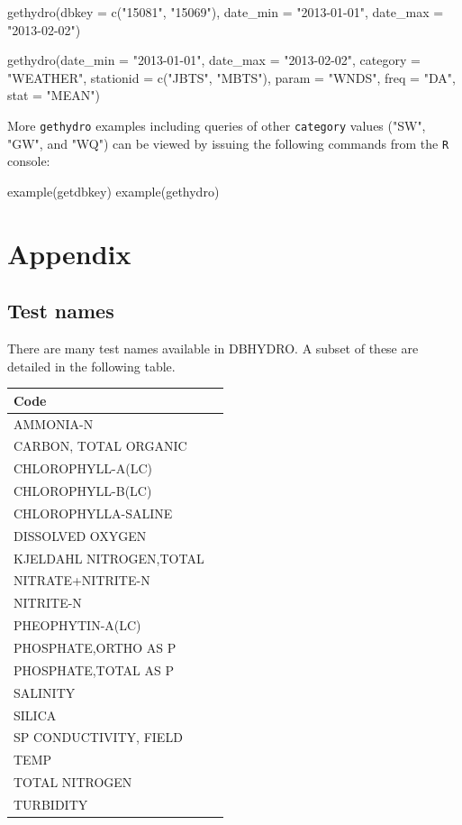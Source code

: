 \documentclass[12pt,notitlepage]{article}
\begin{document}
\begin{Schunk}
\begin{Sinput}
 gethydro(dbkey = c("15081", "15069"), date_min = "2013-01-01",
          date_max = "2013-02-02")
\end{Sinput}
\end{Schunk}

\begin{Schunk}
\begin{Sinput}
 gethydro(date_min = "2013-01-01", date_max = "2013-02-02",
          category = "WEATHER", stationid = c("JBTS", "MBTS"),
          param = "WNDS", freq = "DA", stat = "MEAN")
\end{Sinput}
\end{Schunk}

\noindent More \texttt{gethydro} examples including queries of other \texttt{category} values ("SW", "GW", and "WQ") can be viewed by issuing the following commands from the \texttt{R} console:

\begin{Schunk}
\begin{Sinput}
 example(getdbkey)
 example(gethydro)
\end{Sinput}
\end{Schunk}

\newpage

\section{\label{sec:appendix}Appendix}
\subsection{Test names}
There are many test names available in DBHYDRO. A subset of these are detailed in the following table.\\

\begin{longtable}{| p{} | p{} |} 
\hline
Code\\
\hline
AMMONIA-N\\
CARBON, TOTAL ORGANIC\\
CHLOROPHYLL-A(LC)\\
CHLOROPHYLL-B(LC)\\
CHLOROPHYLLA-SALINE\\
DISSOLVED OXYGEN\\
KJELDAHL NITROGEN,TOTAL\\
NITRATE+NITRITE-N\\
NITRITE-N\\
PHEOPHYTIN-A(LC)\\
PHOSPHATE,ORTHO AS P\\
PHOSPHATE,TOTAL AS P\\
SALINITY\\
SILICA\\
SP CONDUCTIVITY, FIELD\\
TEMP\\
TOTAL NITROGEN\\
TURBIDITY\\
\hline
\end{longtable}
\end{document}
